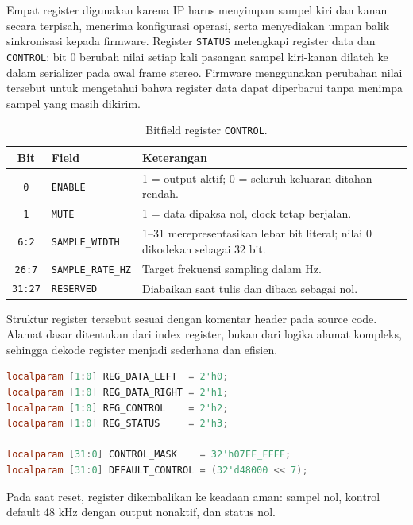 Empat register digunakan karena IP harus menyimpan sampel kiri dan kanan secara terpisah, menerima konfigurasi operasi, serta menyediakan umpan balik sinkronisasi kepada firmware. Register \texttt{STATUS} melengkapi register data dan \texttt{CONTROL}: bit 0 berubah nilai setiap kali pasangan sampel kiri-kanan dilatch ke dalam serializer pada awal frame stereo. Firmware menggunakan perubahan nilai tersebut untuk mengetahui bahwa register data dapat diperbarui tanpa menimpa sampel yang masih dikirim.

\begin{table}[htbp]
\centering
\caption{Bitfield register \texttt{CONTROL}.}
\label{tab:ch4-control-final}
\begin{tabular}{|c|l|p{8.5cm}|}
\hline
\textbf{Bit} & \textbf{Field} & \textbf{Keterangan} \\
\hline
\texttt{0} & \texttt{ENABLE} & 1 = output aktif; 0 = seluruh keluaran ditahan rendah. \\
\texttt{1} & \texttt{MUTE} & 1 = data dipaksa nol, clock tetap berjalan. \\
\texttt{6:2} & \texttt{SAMPLE\_WIDTH} & 1--31 merepresentasikan lebar bit literal; nilai 0 dikodekan sebagai 32 bit. \\
\texttt{26:7} & \texttt{SAMPLE\_RATE\_HZ} & Target frekuensi sampling dalam Hz. \\
\texttt{31:27} & \texttt{RESERVED} & Diabaikan saat tulis dan dibaca sebagai nol. \\
\hline
\end{tabular}
\end{table}

Struktur register tersebut sesuai dengan komentar header pada source code. Alamat dasar ditentukan dari index register, bukan dari logika alamat kompleks, sehingga dekode register menjadi sederhana dan efisien.

\begin{lstlisting}[language=Verilog,caption={Deklarasi indeks register, mask baca, dan nilai default.},label={lst:ch4-reg-define}]
localparam [1:0] REG_DATA_LEFT  = 2'h0;
localparam [1:0] REG_DATA_RIGHT = 2'h1;
localparam [1:0] REG_CONTROL    = 2'h2;
localparam [1:0] REG_STATUS     = 2'h3;

localparam [31:0] CONTROL_MASK    = 32'h07FF_FFFF;
localparam [31:0] DEFAULT_CONTROL = (32'd48000 << 7);
\end{lstlisting}

Pada saat reset, register dikembalikan ke keadaan aman: sampel nol, kontrol default 48 kHz dengan output nonaktif, dan status nol.


